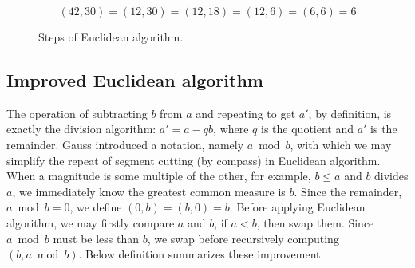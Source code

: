 \documentclass[b5paper]{article}
\begin{document}
\[
(42, 30) = (12, 30) = (12, 18) = (12, 6) = (6, 6) = 6
\]

\begin{figure}[htbp]
  \centering
  \caption{Steps of Euclidean algorithm.}
  \label{fig:line-seg-gcm}
\end{figure}

\subsection{Improved Euclidean algorithm} 
The operation of subtracting $b$ from $a$ and repeating to get $a'$, by definition, is exactly the division algorithm: $a' = a - qb$, where $q$ is the quotient and $a'$ is the remainder. Gauss introduced a notation, namely $a \bmod b$, with which we may simplify the repeat of segment cutting (by compass) in Euclidean algorithm. When a magnitude is some multiple of the other, for example, $b \leq a$ and $b$ divides $a$, we immediately know the greatest common measure is $b$. Since the remainder, $a \bmod b = 0$, we define $(0, b) = (b, 0) = b$. Before applying Euclidean algorithm, we may firstly compare $a$ and $b$, if $a < b$, then swap them. Since $a \bmod b$ must be less than $b$, we swap before recursively computing $(b, a \bmod b)$. Below definition summarizes these improvement.
\end{document}
